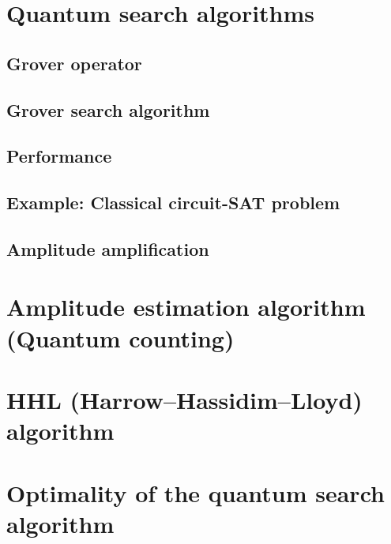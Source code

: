 \section{Quantum search algorithms}
\subsection{Grover operator}
\subsection{Grover search algorithm}
\subsection{Performance}

\subsection{Example: Classical circuit-SAT problem}
\subsection{Amplitude amplification}

\section{Amplitude estimation algorithm (Quantum counting)}

\section{HHL (Harrow–Hassidim–Lloyd) algorithm}

\section{Optimality of the quantum search algorithm}